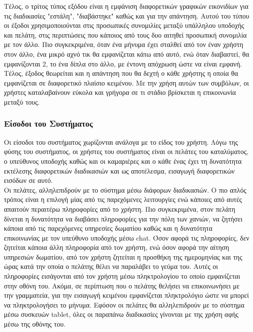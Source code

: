 \noindent
Τέλος, ο τρίτος τύπος εξόδου είναι η εμφάνιση διαφορετικών γραφικών εικονιδίων για τις διαδικασίες 
"εστάλη", "διαβάστηκε" καθώς και για την απάντηση. Αυτού του τύπου οι έξοδοι χρησιμοποιούνται στις 
προσωπικές συνομιλίες μεταξύ υπάλληλου υποδοχής και πελάτη, στις περιπτώσεις που κάποιος από 
τους δυο αιτηθεί προσωπική συνομιλία με τον άλλο. Πιο συγκεκριμένα, όταν ένα μήνυμα  έχει σταλθεί 
από τον έναν χρήστη στον άλλο, ένα μικρό αχνό τικ θα εμφανίζεται κάτω από αυτό, ενώ όταν διαβαστεί, 
θα εμφανίζονται 2, το ένα δίπλα στο άλλο, με έντονη απόχρωση ώστε να είναι εμφανή.  Τέλος, έξοδος
θεωρείται και η απάντηση που θα δεχτή ο κάθε χρήστης η οποία θα εμφανίζεται σε διαφορετικό πλαίσιο 
κειμένου. Με την χρήση αυτών των συμβόλων, οι χρήστες καταλαβαίνουν εύκολα και γρήγορα σε τι 
στάδιο βρίσκεται η επικοινωνία μεταξύ τους.

\subsubsection{Είσοδοι του Συστήματος}

Οι είσοδοι του συστήματος χωρίζονται ανάλογα με το είδος του χρήστη. Λόγω της φύσης του 
συστήματος, οι χρήστες του συστήματος είναι οι πελάτες του καταλύματος, ο υπεύθυνος υποδοχής 
καθώς και οι καμαριέρες και ο κάθε ένας έχει τη δυνατότητα εκτέλεσης διαφορετικών διαδικασιών και ως
αποτέλεσμα, εισαγωγή διαφορετικών εισόδων σε αυτό. \\

\noindent
Οι πελάτες, αλληλεπιδρούν με το σύστημα μέσω διάφορων διαδικασιών. Ο πιο απλός  τρόπος είναι η 
επιλογή μίας από τις παρεχόμενες λειτουργίες ενώ κάποιες από αυτές απαιτούν περαιτέρω πληροφορίες 
από το χρήστη.  Πιο συγκεκριμένα, στον πελάτη δίνεται η δυνατότητα να διαβάσει πληροφορίες για την 
πόλη  των χανιών, να ζητήσει κάποια από τις παρεχόμενες υπηρεσίες δωματίου καθώς και η δυνατότητα 
επικοινωνίας με τον υπεύθυνο υποδοχής μέσω chat. Όσον αφορά τις πληροφορίες, δεν ζητείται κάποια 
άλλη πληροφορία από τον χρήστη, ενώ όσον αφορά την αίτηση υπηρεσιών δωματίου, από τον χρήστη 
ζητείται η προσθήκη της ημερομηνίας και της ώρας κατά την οποία ο πελάτης θέλει να παραλάβει το 
γεύμα του. Αυτές οι πληροφορίες εισάγονται από τον χρήστη  μέσω πληκτρολογίου το οποίο εμφανίζεται 
στην οθόνη του. Ακόμα, σε περίπτωση που ο πελάτης θελήσει να επικοινωνήσει με την γραμματεία, για 
την εισαγωγή κειμένου εμφανίζεται πληκτρολόγιο ώστε να μπορεί να πληκτρολογήσει το μήνυμα. 
Εφόσον οι πελάτες θα αλληλεπιδρούν με το σύστημα μέσω συσκευών tablet, όλες οι παραπάνω
διαδικασίες γίνονται με της χρήση αφής μέσω της οθόνης του. \\

